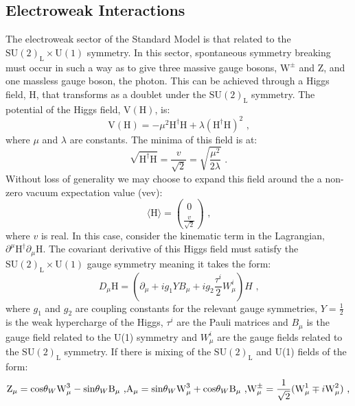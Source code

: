 \subsection{Electroweak Interactions}
The electroweak sector of the Standard Model is that related to the $\text{SU}(2)_{\text{L}} \times \text{U}(1)$ symmetry.  In this sector, spontaneous symmetry breaking must occur in such a way as to give three massive gauge bosons,  $\text{W}^{\pm}$ and Z, and one massless gauge boson, the photon.  This can be achieved through a Higgs field, H, that transforms as a doublet under the $\text{SU}(2)_{\text{L}}$ symmetry.  The potential of the Higgs field, $\text{V}(\text{H})$, is:
%
\begin{equation}
\text{V}(\text{H}) = -\mu^{2}\text{H}^{\dagger}\text{H} + \lambda (\text{H}^{\dagger}\text{H})^{2} \text{ ,}
\end{equation}
%
\noindent where $\mu$ and $\lambda$ are constants.  The minima of this field is at:
%
\begin{equation}
\sqrt{\text{H}^{\dagger}\text{H}} = \frac{v}{\sqrt{2}} = \sqrt{\frac{\mu^{2}}{2\lambda}} \text{ .}
\end{equation}
%
\noindent Without loss of generality we may choose to expand this field around the a non-zero vacuum expectation value (vev):
%
\begin{equation}
\langle \text{H} \rangle = \binom{0}{\frac{v}{\sqrt{2}}} \text{ ,}
\end{equation}
%
\noindent where $v$ is real.  In this case, consider the kinematic term in the Lagrangian, $\partial^{\mu} \text{H}^{\dagger} \partial_{\mu} \text{H}$.  The covariant derivative of this Higgs field must satisfy the $\text{SU}(2)_{\text{L}} \times \text{U}(1)$ gauge symmetry meaning it takes the form:
%
\begin{equation}
D_{\mu} \text{H} = (\partial_{\mu} + ig_{1}YB_{\mu} + ig_{2}\frac{\tau^{i}}{2}W^{i}_{\mu})H \text{ ,}
\end{equation}
%
\noindent where $g_{1}$ and $g_{2}$ are coupling constants for the relevant gauge symmetries, $Y = \frac{1}{2}$ is the weak hypercharge of the Higgs, $\tau^{i}$ are the Pauli matrices and $B_{\mu}$ is the gauge field related to the U(1) symmetry and $W^{i}_{\mu}$ are the gauge fields related to the $\text{SU}(2)_{\text{L}}$ symmetry.  If there is mixing of the $\text{SU}(2)_{\text{L}}$ and U(1) fields of the form:
%
\begin{equation}
\text{Z}_{\mu} = \text{cos}{\theta_{W}} \text{W}^{3}_{\mu} - \text{sin}{\theta_{W}} \text{B}_{\mu} \text{ ,}\\
\text{A}_{\mu} = \text{sin}{\theta_{W}} \text{W}^{3}_{\mu} + \text{cos}{\theta_{W}} \text{B}_{\mu} \text{ ,}\\
\text{W}^{\pm}_{\mu} = \frac{1}{\sqrt{2}}(\text{W}^{1}_{\mu} \mp i \text{W}^{2}_{\mu}) \text{ ,}
\end{equation}
